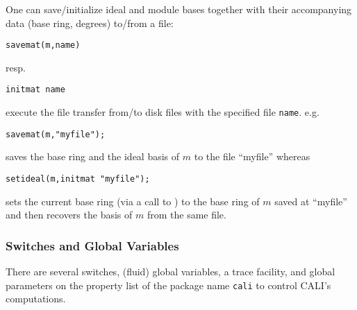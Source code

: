 One can save/initialize ideal and module bases together with their
accompanying data (base ring, degrees) to/from a file:
\begin{verbatim}
savemat(m,name)
\end{verbatim}
resp.
\begin{verbatim}
initmat name
\end{verbatim} execute the file transfer from/to disk files with the
specified file \texttt{name}. e.g.\
\begin{verbatim}
savemat(m,"myfile");
\end{verbatim}
saves the base ring and the ideal basis of $m$ to the file ``myfile''
whereas
\begin{verbatim}
setideal(m,initmat "myfile");
\end{verbatim}
sets the current base ring (via a call to ) to the base
ring of $m$ saved at ``myfile'' and then recovers the basis of $m$
from the same file.

\subsubsection{Switches and Global Variables}

There are several switches, (fluid) global variables, a trace
facility, and global parameters on the property list of the package
name \texttt{cali} to control CALI's computations. 
\medskip


